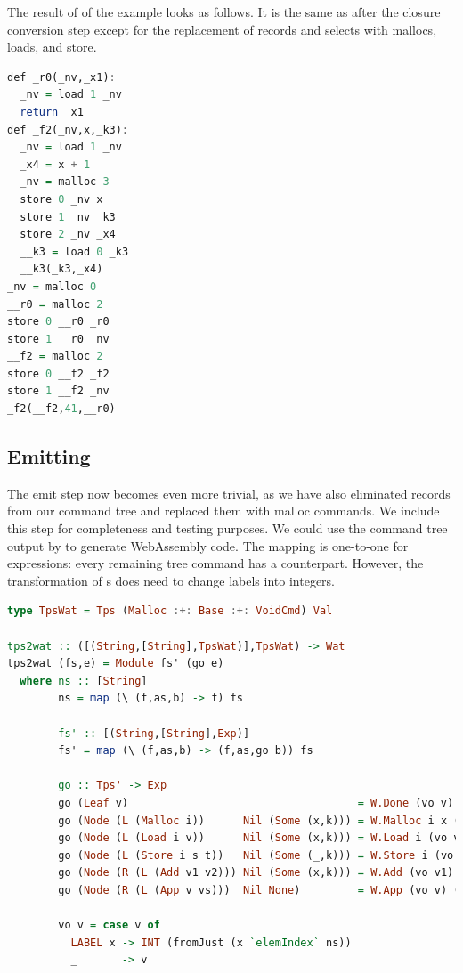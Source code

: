 The result of  of the example  looks as follows. It is the same as  after the closure conversion step except for the replacement of records and selects with mallocs, loads, and store.

\begin{lstlisting}[language=Haskell]
def _r0(_nv,_x1):
  _nv = load 1 _nv
  return _x1
def _f2(_nv,x,_k3):
  _nv = load 1 _nv
  _x4 = x + 1
  _nv = malloc 3
  store 0 _nv x
  store 1 _nv _k3
  store 2 _nv _x4
  __k3 = load 0 _k3
  __k3(_k3,_x4)
_nv = malloc 0
__r0 = malloc 2
store 0 __r0 _r0
store 1 __r0 _nv
__f2 = malloc 2
store 0 __f2 _f2
store 1 __f2 _nv
_f2(__f2,41,__r0)
\end{lstlisting}

\subsection{\label{subsection:emit2}Emitting}
The emit step now becomes even more trivial, as we have also eliminated records from our command tree and replaced them with malloc commands. We include this step for completeness and testing purposes. We could use the command tree output by  to generate WebAssembly code. The mapping is one-to-one for expressions: every remaining tree command has a  counterpart. However, the transformation of s does need to change labels into integers.

\begin{lstlisting}[language=Haskell]
type TpsWat = Tps (Malloc :+: Base :+: VoidCmd) Val

tps2wat :: ([(String,[String],TpsWat)],TpsWat) -> Wat
tps2wat (fs,e) = Module fs' (go e)
  where ns :: [String]
        ns = map (\ (f,as,b) -> f) fs

        fs' :: [(String,[String],Exp)]
        fs' = map (\ (f,as,b) -> (f,as,go b)) fs

        go :: Tps' -> Exp
        go (Leaf v)                                    = W.Done (vo v)
        go (Node (L (Malloc i))      Nil (Some (x,k))) = W.Malloc i x (go k)
        go (Node (L (Load i v))      Nil (Some (x,k))) = W.Load i (vo v) x (go k)
        go (Node (L (Store i s t))   Nil (Some (_,k))) = W.Store i (vo s) (vo t) (go k)
        go (Node (R (L (Add v1 v2))) Nil (Some (x,k))) = W.Add (vo v1) (vo v2) x (go k)
        go (Node (R (L (App v vs)))  Nil None)         = W.App (vo v) (map vo vs)
        
        vo v = case v of
          LABEL x -> INT (fromJust (x `elemIndex` ns))
          _       -> v
\end{lstlisting}

